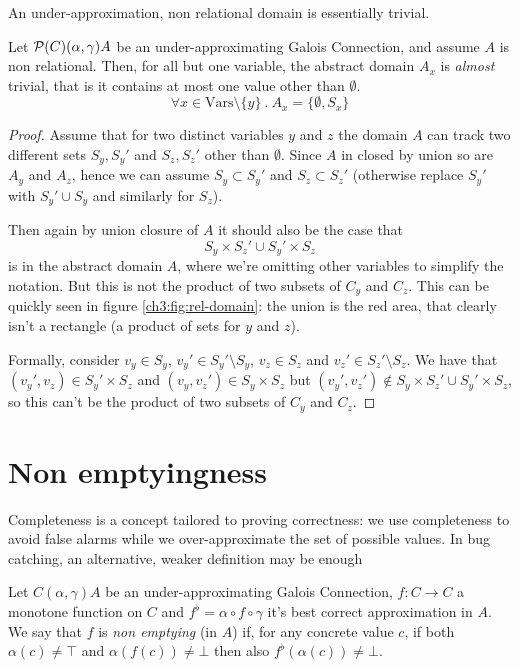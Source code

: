 An under-approximation, non relational domain is essentially trivial.
\begin{prop}\label{ch3:th:underapprox-non-rel}
	Let $\mathcal{P}(C) (\alpha, \gamma) A$ be an under-approximating Galois Connection, and assume $A$ is non relational. Then, for all but one variable, the abstract domain $A_x$ is \textit{almost} trivial, that is it contains at most one value other than $\emptyset$.
	\[
	\forall x \in \text{Vars} \setminus \{ y \} \ .\ A_x = \{ \emptyset, S_x \}
	\]
\end{prop}
\begin{proof}
	Assume that for two distinct variables $y$ and $z$ the domain $A$ can track two different sets $S_y, S_y'$ and $S_z, S_z'$ other than $\emptyset$.
	Since $A$ in closed by union %
	so are $A_y$ and $A_z$, hence we can assume $S_y \subset S_y'$ and $S_z \subset S_z'$ (otherwise replace $S_y'$ with $S_y' \cup S_y$ and similarly for $S_z$).
	
	Then again by union closure of $A$ it should also be the case that
	\[
	S_y \times S_z' \cup S_y' \times S_z
	\]
	is in the abstract domain $A$, where we're omitting other variables to simplify the notation. But this is not the product of two subsets of $C_y$ and $C_z$. This can be quickly seen in figure \ref{ch3:fig:rel-domain}: the union is the red area, that clearly isn't a rectangle (a product of sets for $y$ and $z$).

	Formally, consider $v_y \in S_y$, $v_y' \in S_y' \setminus S_y$, $v_z \in S_z$ and $v_z' \in S_z' \setminus S_z$. We have that $(v_y', v_z) \in S_y' \times S_z$ and $(v_y, v_z') \in S_y \times S_z$ but $(v_y', v_z') \notin S_y \times S_z' \cup S_y' \times S_z$, so this can't be the product of two subsets of $C_y$ and $C_z$.
\end{proof}
\begin{figure}[!th]
\end{figure}

\section{Non emptyingness}
Completeness is a concept tailored to proving correctness: we use completeness to avoid false alarms while we over-approximate the set of possible values. In bug catching, an alternative, weaker definition may be enough
\begin{definition}\label{ch3:def:non-emptying}
	Let $C (\alpha, \gamma) A$ be an under-approximating Galois Connection, $f : C \rightarrow C$ a monotone function on $C$ and $f^{\flat} = \alpha \circ f \circ \gamma$ it's best correct approximation in $A$.
	We say that $f$ is \textit{non emptying} (in $A$) if, for any concrete value $c$, if both $\alpha(c) \neq \top$ and $\alpha(f(c)) \neq \bot$ then also $f^{\flat}(\alpha(c)) \neq \bot$.
\end{definition}

